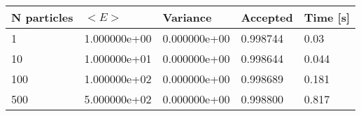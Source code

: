\begin{table}[h!]
\centering 
\begin{tabular}{|l|l|l|l|l|}
\hline 
N particles & $<E>$ & Variance & Accepted & Time [s]\\ 
 \hline 
1 & 1.000000e+00 & 0.000000e+00 & 0.998744 & 0.03 \\ \hline 
10 & 1.000000e+01 & 0.000000e+00 & 0.998644 & 0.044 \\ \hline 
100 & 1.000000e+02 & 0.000000e+00 & 0.998689 & 0.181 \\ \hline 
500 & 5.000000e+02 & 0.000000e+00 & 0.998800 & 0.817 \\ \hline 
\end{tabular}
\label{tab:ia2} 
\end{table} 
